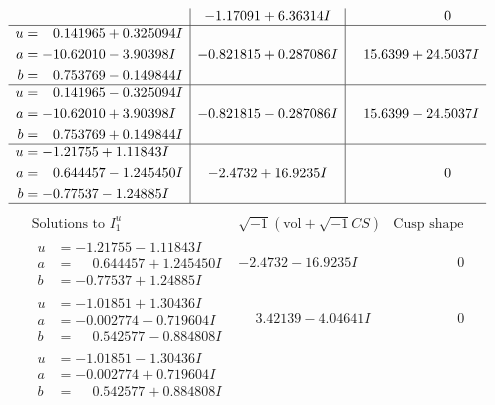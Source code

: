 \documentclass[1p]{elsarticle_modified}
\theoremstyle{definition}
\newcommand{\I}{\sqrt{-1}}
\begin{document}
$$\begin{array}{c|c|c}
 & -1.17091 + 6.36314 I & \phantom{-0.000000 } 0 \\ \hline\begin{aligned}
u &= \phantom{-}0.141965 + 0.325094 I \\
a &= -10.62010 - 3.90398 I \\
b &= \phantom{-}0.753769 - 0.149844 I\end{aligned}
 & -0.821815 + 0.287086 I & \phantom{-}15.6399 + 24.5037 I \\ \hline\begin{aligned}
u &= \phantom{-}0.141965 - 0.325094 I \\
a &= -10.62010 + 3.90398 I \\
b &= \phantom{-}0.753769 + 0.149844 I\end{aligned}
 & -0.821815 - 0.287086 I & \phantom{-}15.6399 - 24.5037 I \\ \hline\begin{aligned}
u &= -1.21755 + 1.11843 I \\
a &= \phantom{-}0.644457 - 1.245450 I \\
b &= -0.77537 - 1.24885 I\end{aligned}
 & -2.4732 + 16.9235 I & \phantom{-0.000000 } 0\\
 \hline 
 \end{array}$$\newpage$$\begin{array}{c|c|c}  
\text{Solutions to }I^u_{1}& \I (\text{vol} + \sqrt{-1}CS) & \text{Cusp shape}\\
 \hline 
\begin{aligned}
u &= -1.21755 - 1.11843 I \\
a &= \phantom{-}0.644457 + 1.245450 I \\
b &= -0.77537 + 1.24885 I\end{aligned}
 & -2.4732 - 16.9235 I & \phantom{-0.000000 } 0 \\ \hline\begin{aligned}
u &= -1.01851 + 1.30436 I \\
a &= -0.002774 - 0.719604 I \\
b &= \phantom{-}0.542577 - 0.884808 I\end{aligned}
 & \phantom{-}3.42139 - 4.04641 I & \phantom{-0.000000 } 0 \\ \hline\begin{aligned}
u &= -1.01851 - 1.30436 I \\
a &= -0.002774 + 0.719604 I \\
b &= \phantom{-}0.542577 + 0.884808 I\end{aligned}

\end{array}$$
\end{document}
